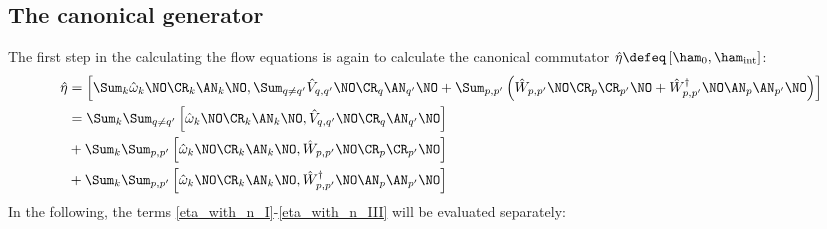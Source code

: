 \begin{appendix}
\subsection{The canonical generator}
The first step in the calculating the flow equations is again to calculate the canonical commutator $\hat\eta\defeq\left[\ham_0,\ham_{\mathrm{int}}\right]$:
\begin{subequations}
\begin{align}
\hat\eta &= \left[\Sum_k \hat\omega_k \NO\CR_k\AN_k\NO,\Sum_{q\neq q^\prime}\hat V_{q,q^\prime}\NO \CR_q\AN_{q^\prime}\NO+\Sum_{p,p^\prime}\left(\hat W_{p,p^\prime}\NO \CR_p\CR_{p^\prime}\NO+\hat W_{p,p^\prime}^\dagger\NO\AN_p\AN_{p^\prime}\NO\right)\right]  \nonumber\\ \quad& 
= \Sum_k \Sum_{q\neq q^\prime}\left[ \hat\omega_k \NO\CR_k\AN_k\NO,\hat V_{q,q^\prime}\NO \CR_q\AN_{q^\prime}\NO\right] \label{eta_with_n_I}\\ \quad& 
+ \Sum_k\Sum_{p,p^\prime}\left[\hat\omega_k \NO\CR_k\AN_k\NO,\hat W_{p,p^\prime}\NO \CR_p\CR_{p^\prime}\NO\right] \label{eta_with_n_II} \\ \quad& 
+ \Sum_k\Sum_{p,p^\prime}\left[ \hat\omega_k \NO\CR_k\AN_k\NO,\hat W_{p,p^\prime}^\dagger\NO\AN_p\AN_{p^\prime} \NO \right] \label{eta_with_n_III}
\end{align}
\end{subequations}
In the following, the terms \ref{eta_with_n_I}-\ref{eta_with_n_III} will be evaluated separately:


\end{appendix}
